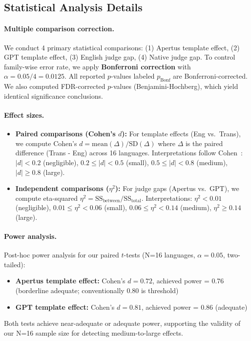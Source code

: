 \subsection{Statistical Analysis Details}
\label{app:statistics}

\paragraph{Multiple comparison correction.}
We conduct 4 primary statistical comparisons: (1) Apertus template effect, (2) GPT template effect, (3) English judge gap, (4) Native judge gap. To control family-wise error rate, we apply \textbf{Bonferroni correction} with $\alpha = 0.05/4 = 0.0125$. All reported $p$-values labeled $p_{\text{Bonf}}$ are Bonferroni-corrected. We also computed FDR-corrected $p$-values (Benjamini-Hochberg), which yield identical significance conclusions.

\paragraph{Effect sizes.}
\begin{itemize}[leftmargin=1.2em, itemsep=1pt]
  \item \textbf{Paired comparisons (Cohen's $d$):} For template effects (Eng vs.\ Trans), we compute Cohen's $d = \text{mean}(\Delta) / \text{SD}(\Delta)$ where $\Delta$ is the paired difference (Trans - Eng) across 16 languages. Interpretations follow Cohen~\citep{cohen1988statistical}: $|d| < 0.2$ (negligible), $0.2 \leq |d| < 0.5$ (small), $0.5 \leq |d| < 0.8$ (medium), $|d| \geq 0.8$ (large).
  \item \textbf{Independent comparisons ($\eta^2$):} For judge gaps (Apertus vs.\ GPT), we compute eta-squared $\eta^2 = \text{SS}_{\text{between}} / \text{SS}_{\text{total}}$. Interpretations: $\eta^2 < 0.01$ (negligible), $0.01 \leq \eta^2 < 0.06$ (small), $0.06 \leq \eta^2 < 0.14$ (medium), $\eta^2 \geq 0.14$ (large).
\end{itemize}

\paragraph{Power analysis.}
Post-hoc power analysis for our paired $t$-tests (N=16 languages, $\alpha=0.05$, two-tailed):
\begin{itemize}[leftmargin=1.2em, itemsep=1pt]
  \item \textbf{Apertus template effect:} Cohen's $d=0.72$, achieved power = 0.76 (borderline adequate; conventionally 0.80 is threshold)
  \item \textbf{GPT template effect:} Cohen's $d=0.81$, achieved power = 0.86 (adequate)
\end{itemize}
Both tests achieve near-adequate or adequate power, supporting the validity of our N=16 sample size for detecting medium-to-large effects.


